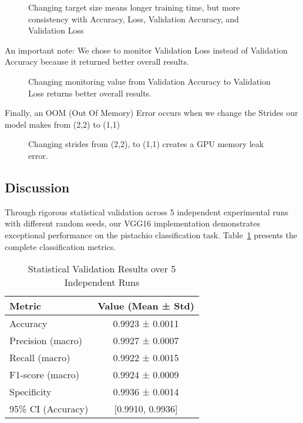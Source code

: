 \documentclass[conference]{IEEEtran}
\begin{document}
\begin{figure}[htbp]
    \centering
    \caption{Changing target size means longer training time, but more consistency with Accuracy, Loss, Validation Accuracy, and Validation Loss }
    \label{fig:1.4}
\end{figure}
\FloatBarrier 

\hfill \break
\hfill \break
\hfill \break
\hfill \break

An important note:
We chose to monitor Validation Loss instead of Validation Accuracy because it returned better overall results.

\begin{figure}[htbp]
    \centering
    \caption{Changing monitoring value from Validation Accuracy to Validation Loss returns better overall results.}
    \label{fig:1.4}
\end{figure}
\FloatBarrier 

Finally, an OOM (Out Of Memory) Error occurs when we change the Strides our model makes from (2,2) to (1,1)

\begin{figure}[htbp]
    \centering
    \caption{Changing strides from (2,2), to (1,1) creates a GPU memory leak error.}
    \label{fig:1.4}
\end{figure}
\FloatBarrier 

\subsection{Discussion}
Through rigorous statistical validation across 5 independent experimental runs with different random seeds, our VGG16 implementation demonstrates exceptional performance on the pistachio classification task. Table~\ref{tab:statistical_validation} presents the complete classification metrics.

\begin{table}[htbp]
\centering
\caption{Statistical Validation Results over 5 Independent Runs}
\label{tab:statistical_validation}
\begin{tabular}{lc}
\hline
\textbf{Metric} & \textbf{Value (Mean ± Std)} \\
\hline
Accuracy & 0.9923 ± 0.0011 \\
Precision (macro) & 0.9927 ± 0.0007 \\
Recall (macro) & 0.9922 ± 0.0015 \\
F1-score (macro) & 0.9924 ± 0.0009 \\
Specificity & 0.9936 ± 0.0014 \\
\hline
95\% CI (Accuracy) & [0.9910, 0.9936] \\
\hline
\end{tabular}
\end{table}
\end{document}
